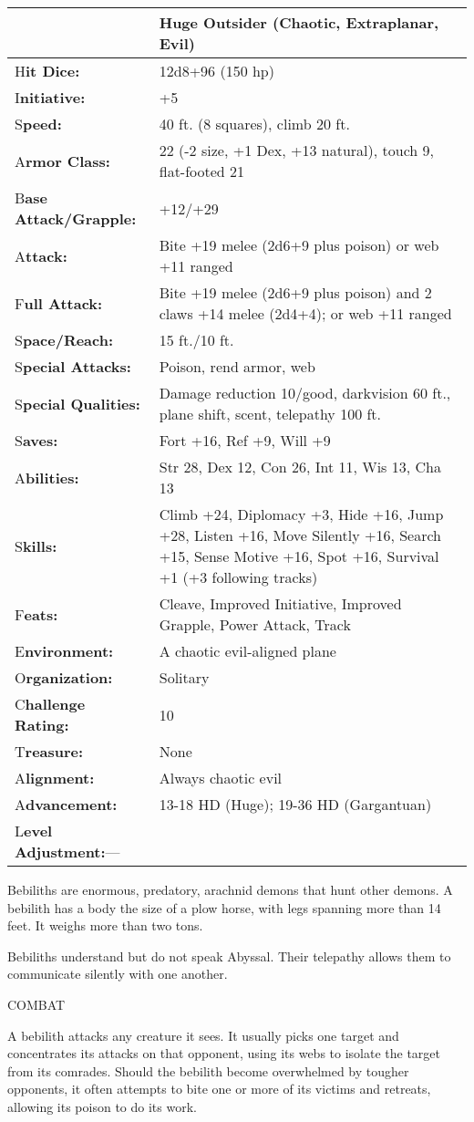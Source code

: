 \documentclass{article}
\begin{document}
\begin{tabular}{|>{\raggedright}p{91pt}|>{\raggedright}p{231pt}|}
\hline
  & Huge Outsider (Chaotic, Extraplanar, Evil)\tabularnewline
\hline
H\textbf{it Dice:} & 12d8+96 (150 hp)\tabularnewline
\hline
I\textbf{nitiative:} & +5\tabularnewline
\hline
S\textbf{peed:} & 40 ft. (8 squares), climb 20 ft.\tabularnewline
\hline
A\textbf{rmor Class:} & 22 (-2 size, +1 Dex, +13 natural), touch 9, flat-footed 
21\tabularnewline
\hline
B\textbf{ase Attack/Grapple:} & +12/+29\tabularnewline
\hline
A\textbf{ttack:} & Bite +19 melee (2d6+9 plus poison) or web +11 ranged\tabularnewline
\hline
F\textbf{ull Attack:} & Bite +19 melee (2d6+9 plus poison) and 2 claws +14 melee 
(2d4+4); or web +11 ranged\tabularnewline
\hline
S\textbf{pace/Reach:} & 15 ft./10 ft.\tabularnewline
\hline
S\textbf{pecial Attacks:} & Poison, rend armor, web\tabularnewline
\hline
S\textbf{pecial Qualities:} & Damage reduction 10/good, darkvision 60 ft., plane 
shift, scent, telepathy 100 ft.\tabularnewline
\hline
S\textbf{aves:} & Fort +16, Ref +9, Will +9\tabularnewline
\hline
A\textbf{bilities:} & Str 28, Dex 12, Con 26, Int 11, Wis 13, Cha 13\tabularnewline
\hline
S\textbf{kills:} & Climb +24, Diplomacy +3, Hide +16, Jump +28, Listen +16, Move 
Silently +16, Search +15, Sense Motive +16, Spot +16, Survival +1 (+3 following 
tracks)\tabularnewline
\hline
F\textbf{eats:} & Cleave, Improved Initiative, Improved Grapple, Power Attack, 
Track\tabularnewline
\hline
E\textbf{nvironment:} & A chaotic evil-aligned plane\tabularnewline
\hline
O\textbf{rganization:} & Solitary\tabularnewline
\hline
C\textbf{hallenge Rating:} & 10\tabularnewline
\hline
T\textbf{reasure:} & None\tabularnewline
\hline
A\textbf{lignment:} & Always chaotic evil\tabularnewline
\hline
A\textbf{dvancement:} & 13-18 HD (Huge); 19-36 HD (Gargantuan)\tabularnewline
\hline
L\textbf{evel Adjustment:}--- & \tabularnewline
\hline
\end{tabular}

Bebiliths are enormous, predatory, arachnid demons that hunt other demons. A bebilith 
has a body the size of a plow horse, with legs spanning more than 14 feet. It weighs 
more than two tons.

Bebiliths understand but do not speak Abyssal. Their telepathy allows them to communicate 
silently with one another.

COMBAT

A bebilith attacks any creature it sees. It usually picks one target and concentrates 
its attacks on that opponent, using its webs to isolate the target from its comrades. 
Should the bebilith become overwhelmed by tougher opponents, it often attempts 
to bite one or more of its victims and retreats, allowing its poison to do its 
work.
\end{document}
